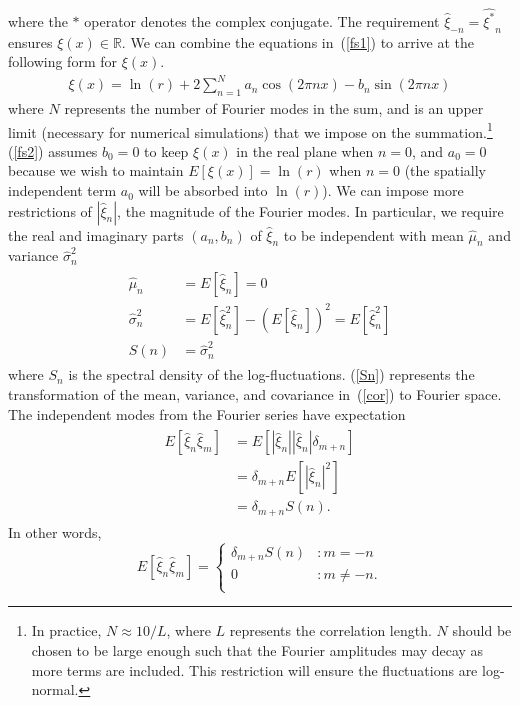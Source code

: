 where the $*$ operator denotes the complex
conjugate. The requirement $\hat{\xi}_{-n}=\hat{\xi^*}_{n}$ ensures
$\xi(x) \in \mathbb{R}$. We can combine
the equations in~(\ref{fs1}) to arrive at the following form for
$\xi(x)$.
\begin{align}\label{fs2}
\xi(x) = \ln(r) + 2\sum^N_{n=1}a_n\cos(2\pi nx)-b_n\sin(2\pi nx)
\end{align}
where $N$ represents the number of Fourier modes in the sum, and is an
upper limit (necessary for numerical
simulations) that we impose on the summation.\footnote{In practice, $N
  \approx 10/L$, where $L$ represents the correlation length. $N$
  should be chosen to be large enough such that the Fourier amplitudes
may decay as more terms are included. This restriction will ensure the
fluctuations are log-normal.} (\ref{fs2}) assumes
$b_0=0$ to keep $\xi(x)$ in the real plane when $n=0$, and $a_0=0$
because we wish to maintain $E[\xi(x)]=\ln(r)$ when $n=0$ (the
spatially independent term $a_0$ will be absorbed into $\ln(r)$).
We can impose more restrictions of $|\hat{\xi}_n|$, the magnitude of
the Fourier modes. In particular,
we require the real and imaginary parts $(a_n,b_n)$ of $\hat{\xi}_n$
to be independent with mean $\hat{\mu}_n$ and variance $\hat{\sigma}^2_n$
\begin{align}
\begin{split}\label{Sn}
\hat{\mu}_n&=E[\hat{\xi}_n]=0\\
\hat{\sigma}_n^2&=E[\hat{\xi}_n^2]-(E[\hat{\xi}_n])^2=E[\hat{\xi}_n^2]\\
S(n)&=\hat{\sigma}_n^2
\end{split}
\end{align}
where $S_n$ is the spectral density of the
log-fluctuations. (\ref{Sn}) represents the transformation of the
mean, variance, and covariance in~(\ref{cor}) to Fourier space. The
independent modes from the Fourier series have expectation
\begin{align*}
\begin{split}
E[\hat{\xi}_n\hat{\xi}_m]&=E[|\hat{\xi}_n||\hat{\xi}_n|\delta_{m+n}]\\
&=\delta_{m+n}E[|\hat{\xi}_n|^2]\\
&=\delta_{m+n}S(n).
\end{split}
\end{align*}
In other words, 
\begin{displaymath}
   E[\hat{\xi}_n\hat{\xi}_m] = \left\{
     \begin{array}{lr}
       \delta_{m+n}S(n) & : m = -n\\
       0 & : m \neq -n.\\
     \end{array}
   \right.
\end{displaymath} 
